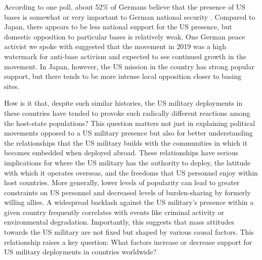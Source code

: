 According to one poll, about 52\% of Germans believe that the presence of US bases is somewhat or very important to German national security \cite{Gramlich2020}. Compared to Japan, there appears to be less national support for the US presence, but domestic opposition to particular bases is relatively weak. One German peace activist we spoke with suggested that the movement in 2019 was a high watermark for anti-base activism and expected to see continued growth in the movement. In Japan, however, the US mission in the country has strong popular support, but there tends to be more intense local opposition closer to basing sites. 

How is it that, despite such similar histories, the US military deployments in these countries have tended to provoke such radically different reactions among the host-state populations? This question matters not just in explaining political movements opposed to a US military presence but also for better understanding the relationships that the US military builds with the communities in which it becomes embedded when deployed abroad. These relationships have serious implications for where the US military has the authority to deploy, the latitude with which it operates overseas, and the freedoms that US personnel enjoy within host countries. More generally, lower levels of popularity can lead to greater constraints on US personnel and decreased levels of burden-sharing by formerly willing allies. A widespread backlash against the US military's presence within a given country frequently correlates with events like criminal activity or environmental degradation. Importantly, this suggests that mass attitudes towards the US military are not fixed but shaped by various causal factors. This relationship raises a key question: What factors increase or decrease support for US military deployments in countries worldwide?  %




